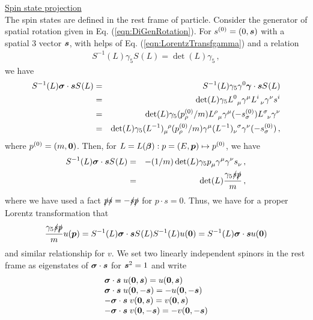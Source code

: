 \noindent
\underline{Spin state projection}\\
The spin states are defined in the rest frame of particle.
Consider the generator of spatial rotation given in Eq. (\ref{eqn:DiGenRotation}).
For $s^{(0)}= (0, \mbox{\boldmath $s$})$ with a spatial 3 vector $\mbox{\boldmath $s$}$, 
with helps of Eq. (\ref{eqn:LorentzTransfgamma}) and a relation
\begin{eqnarray}
S^{-1}(L) \gamma_5 S^{}(L) = \det (L) \gamma_5\,,
\end{eqnarray}
we have 
\begin{eqnarray}
S^{-1}(L) \mbox{\boldmath $\sigma$} \cdot \mbox{\boldmath $s$} S^{}(L) 
&=&
S^{-1}(L) \gamma_5 \gamma^0 \mbox{\boldmath $\gamma$} \cdot \mbox{\boldmath $s$} S^{}(L) 
\nonumber\\
&=&
\det (L) \gamma_5 L^0_{\;\;\mu} \gamma^\mu L^{i}_{\;\;\nu} \gamma^\nu s^i
\nonumber\\
&=&
\det (L) \gamma_5 (p^{(0)}_\rho / m) L^\rho_{\;\;\mu} \gamma^\mu (- s^{(0)}_\sigma) L^{\sigma}_{\;\;\nu} \gamma^\nu 
\nonumber\\
&=&
\det (L) \gamma_5  (L^{-1})^{\;\;\rho}_{\mu} (p^{(0)}_\rho / m) \gamma^\mu  
(L^{-1})^{\;\;\sigma}_{\nu} \gamma^\nu (- s^{(0)}_\sigma)\,,
\nonumber
\end{eqnarray}
where $p^{(0)}= (m, \mbox{\boldmath $0$})$.
Then, for $L= L(\mbox{\boldmath $\beta$}): p = (E, \mbox{\boldmath $p$}) \mapsto p^{(0)}$,
we have
\begin{eqnarray}
S^{-1}(L) \mbox{\boldmath $\sigma$} \cdot \mbox{\boldmath $s$} S^{}(L) 
&=&
- (1/m) \det (L) \gamma_5  p^{}_\mu  \gamma^\mu   \gamma^\nu  s^{}_\nu\,,
\nonumber\\
&=&
\det (L) \frac{\gamma_5 \slashed{s} \slashed{p}}{m}\,,
\end{eqnarray}
where we have used a fact $\slashed{p} \slashed{s} = - \slashed{s} \slashed{p} $
for $p\cdot s = 0$.
Thus, we have for a proper Lorentz transformation that
\begin{eqnarray}
\frac{\gamma_5 \slashed{s} \slashed{p}}{m}
u(\mbox{\boldmath $p$})
=
S^{-1}(L) \mbox{\boldmath $\sigma$} \cdot \mbox{\boldmath $s$} S^{}(L) S^{-1}(L) u(\mbox{\boldmath $0$})
=
S^{-1}(L) \mbox{\boldmath $\sigma$} \cdot \mbox{\boldmath $s$} u(\mbox{\boldmath $0$})
\end{eqnarray}
and similar relationship for $v$. We set two linearly independent spinors 
in the rest frame as eigenstates of $\mbox{\boldmath $\sigma$}\cdot \mbox{\boldmath $s$}$ 
for $\mbox{\boldmath $s$}^2 = 1$
and write
\begin{eqnarray}
\begin{array}{l}
\mbox{\boldmath $\sigma$}\cdot \mbox{\boldmath $s$}\; u(\mbox{\boldmath $0$}, \mbox{\boldmath $s$} ) = u(\mbox{\boldmath $0$}, \mbox{\boldmath $s$} )
\\
\mbox{\boldmath $\sigma$}\cdot \mbox{\boldmath $s$}\; u(\mbox{\boldmath $0$}, -\mbox{\boldmath $s$} ) = -u(\mbox{\boldmath $0$}, -\mbox{\boldmath $s$} )
\\
- \mbox{\boldmath $\sigma$}\cdot \mbox{\boldmath $s$}\; v(\mbox{\boldmath $0$}, \mbox{\boldmath $s$} ) =  v(\mbox{\boldmath $0$}, \mbox{\boldmath $s$} )
\\
- \mbox{\boldmath $\sigma$}\cdot \mbox{\boldmath $s$}\; v(\mbox{\boldmath $0$}, -\mbox{\boldmath $s$} ) =  - v(\mbox{\boldmath $0$}, -\mbox{\boldmath $s$} )
\end{array}
\end{eqnarray}
